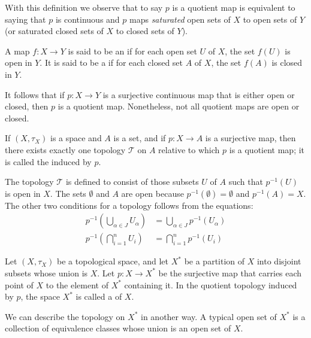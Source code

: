 \documentclass[12pt, a4paper, oneside, openright, titlepage]{book}
\begin{document}
With this definition we observe that to say $p$ is a quotient map is equivalent to saying that $p$ is continuous and $p$ maps \emph{saturated} open sets of $X$ to open sets of $Y$ (or saturated closed sets of $X$ to closed sets of $Y$).

\begin{defn}
    A map $f:X\rightarrow Y$ is said to be an  if for each open set $U$ of $X$, the set $f(U)$ is open in $Y$. It is said to be a  if for each closed set $A$ of $X$, the set $f(A)$ is closed in $Y$.
\end{defn}

It follows that if $p:X\rightarrow Y$ is a surjective continuous map that is either open or closed, then $p$ is a quotient map. Nonetheless, not all quotient maps are open or closed.

\begin{defn}
    If $(X,\tau_X)$ is a space and $A$ is a set, and if $p:X\rightarrow A$ is a surjective map, then there exists exactly one topology $\mathcal{T}$ on $A$ relative to which $p$ is a quotient map; it is called the  induced by $p$.
\end{defn}


The topology $\mathcal{T}$ is defined to consist of those subsets $U$ of $A$ such that $p^{-1}(U)$ is open in $X$. The sets $\emptyset$ and $A$ are open because $p^{-1}(\emptyset) = \emptyset$ and $p^{-1}(A) = X$. The other two conditions for a topology follows from the equations: \begin{align*}
    p^{-1}\left(\bigcup_{\alpha \in J}U_{\alpha}\right) &= \bigcup_{\alpha \in J}p^{-1}(U_{\alpha}) \\
    p^{-1}\left(\bigcap_{i = 1}^nU_i\right) &= \bigcap_{i=1}^np^{-1}(U_i)
\end{align*}


\begin{defn}
    Let $(X,\tau_X)$ be a topological space, and let $X^*$ be a partition of $X$ into disjoint subsets whose union is $X$. Let $p:X\rightarrow X^*$ be the surjective map that carries each point of $X$ to the element of $X^*$ containing it. In the quotient topology induced by $p$, the space $X^*$ is called a  of $X$.
\end{defn}

We can describe the topology on $X^*$ in another way. A typical open set of $X^*$ is a collection of equivalence classes whose union is an open set of $X$.
\end{document}
